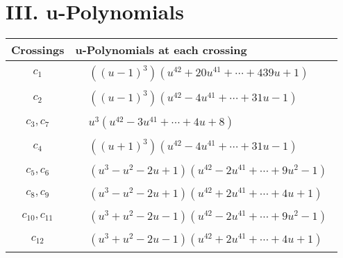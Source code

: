 \documentclass[1p]{elsarticle_modified}
\theoremstyle{definition}
\begin{document}
\newpage\renewcommand{\arraystretch}{1}
\centering \section*{ III. u-Polynomials}
\begin{tabular}{m{50pt}|m{274pt}}
Crossings & \hspace{64pt}u-Polynomials at each crossing \\
\hline $$\begin{aligned}c_{1}\end{aligned}$$&$\begin{aligned}
&((u-1)^3)(u^{42}+20 u^{41}+\cdots+439 u+1)
\end{aligned}$\\
\hline $$\begin{aligned}c_{2}\end{aligned}$$&$\begin{aligned}
&((u-1)^3)(u^{42}-4 u^{41}+\cdots+31 u-1)
\end{aligned}$\\
\hline $$\begin{aligned}c_{3},c_{7}\end{aligned}$$&$\begin{aligned}
&u^3(u^{42}-3 u^{41}+\cdots+4 u+8)
\end{aligned}$\\
\hline $$\begin{aligned}c_{4}\end{aligned}$$&$\begin{aligned}
&((u+1)^3)(u^{42}-4 u^{41}+\cdots+31 u-1)
\end{aligned}$\\
\hline $$\begin{aligned}c_{5},c_{6}\end{aligned}$$&$\begin{aligned}
&(u^3- u^2-2 u+1)(u^{42}-2 u^{41}+\cdots+9 u^2-1)
\end{aligned}$\\
\hline $$\begin{aligned}c_{8},c_{9}\end{aligned}$$&$\begin{aligned}
&(u^3- u^2-2 u+1)(u^{42}+2 u^{41}+\cdots+4 u+1)
\end{aligned}$\\
\hline $$\begin{aligned}c_{10},c_{11}\end{aligned}$$&$\begin{aligned}
&(u^3+u^2-2 u-1)(u^{42}-2 u^{41}+\cdots+9 u^2-1)
\end{aligned}$\\
\hline $$\begin{aligned}c_{12}\end{aligned}$$&$\begin{aligned}
&(u^3+u^2-2 u-1)(u^{42}+2 u^{41}+\cdots+4 u+1)
\end{aligned}$\\
\hline
\end{tabular}\newpage\renewcommand{\arraystretch}{1}
\end{document}
